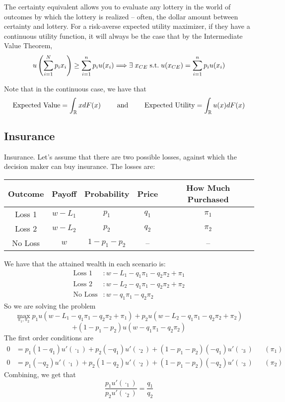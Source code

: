 \documentclass[12pt]{article}
\begin{document}
The certainty equivalent allows you to evaluate any lottery in the world of outcomes by which the lottery is realized -- often, the dollar amount between certainty and lottery. For a risk-averse expected utility maximizer, if they have a continuous utility function, it will always be the case that by the Intermediate Value Theorem,
\[
u\parl \sum_{i=1}^N p_ix_i\parr \ge \sum_{i=1}^n p_i u(x_i) \Longrightarrow \exists x_{CE} \st u(x_{CE}) = \sum_{i=1}^n p_i u(x_i)
\]

\begin{remark}
	Note that in the continuous case, we have that 
	\[
	\text{Expected Value} = \int_{\mathbb{R}} x dF(x) \qquad \text{ and } \qquad\text{Expected Utility} = \int_{\mathbb{R}} u(x) dF(x)
	\]
\end{remark}

\subsection{Insurance}

\begin{example}
	Insurance. Let's assume that there are two possible losses, against which the decision maker can buy insurance. The losses are:
	
	\begin{table}[H]
		\centering
		\begin{tabular}{|c|c|c|c|c|}
			\hline 
			Outcome & Payoff & Probability & Price & How Much Purchased \\
			\hline 
			Loss 1 & $w - L_1$ & $p_1$ & $q_1$ & $\pi_1$ \\
			\hline 
			Loss 2 & $w - L_2$ & $p_2$ & $q_2$ & $\pi_2$ \\
			\hline
			No Loss & $w$ & $1 - p_1 - p_2$ & -- & -- \\
			\hline
		\end{tabular}
	\end{table}
	We have that the attained wealth in each scenario is:
	\begin{align*}
		\text{Loss 1} &: w - L_1 - q_1\pi_1 - q_2\pi_2 + \pi_1 \\
		\text{Loss 2} &: w - L_2 - q_1\pi_1 - q_2\pi_2 + \pi_2 \\
		\text{No Loss} &: w - q_1\pi_1 - q_2\pi_2 
	\end{align*}
	So we are solving the problem
	\[
	\max_{\pi_1,\pi_2} p_1 u(w - L_1 - q_1\pi_1 - q_2\pi_2 + \pi_1) + p_2 u( w - L_2 - q_1\pi_1 - q_2\pi_2 + \pi_2)
	\]
	\[
	+ (1-p_1-p_2) u(w - q_1\pi_1 - q_2\pi_2 )
	\]
	The first order conditions are
	\begin{align*}
		0 &= p_1(1-q_1) u'(\cdot_1) + p_2(-q_1) u'(\cdot_2) + (1-p_1-p_2)(-q_1) u'(\cdot_3) &&(\pi_1) \\
		0 &= p_1(-q_2) u'(\cdot_1) + p_2(1-q_2)u'(\cdot_2) + (1-p_1-p_2)(-q_2) u'(\cdot_3) &&(\pi_2)
	\end{align*}
	Combining, we get that
	\[
	\frac{p_1 u'(\cdot_1)}{p_2 u'(\cdot_2)} = \frac{q_1}{q_2}
	\]
\end{example}
\end{document}
